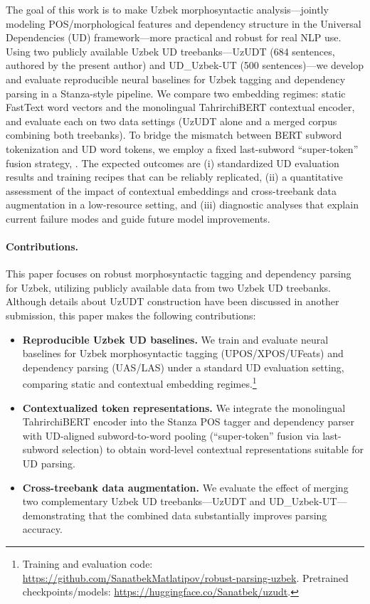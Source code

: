 \documentclass[runningheads]{llncs}
\begin{document}
The goal of this work is to make Uzbek morphosyntactic analysis---jointly modeling POS/morphological features and dependency structure in the Universal Dependencies (UD) framework---more practical and robust for real NLP use. Using two publicly available Uzbek UD treebanks---UzUDT (684 sentences, authored by the present author) and UD\_Uzbek-UT (500 sentences)---we develop and evaluate reproducible neural baselines for Uzbek tagging and dependency parsing in a Stanza-style pipeline\cite{Qi2020-zr}. We compare two embedding regimes: static FastText word vectors and the monolingual TahrirchiBERT contextual encoder, and evaluate each on two data settings (UzUDT alone and a merged corpus combining both treebanks). To bridge the mismatch between BERT subword tokenization and UD word tokens, we employ a fixed last-subword ``super-token'' fusion strategy\cite{Ho2021-cc}, \cite{hopton-etal-2025-functional}. The expected outcomes are (i) standardized UD evaluation results and training recipes that can be reliably replicated, (ii) a quantitative assessment of the impact of contextual embeddings and cross-treebank data augmentation in a low-resource setting, and (iii) diagnostic analyses that explain current failure modes and guide future model improvements.

\paragraph{Contributions.}
This paper focuses on robust morphosyntactic tagging and dependency parsing for Uzbek, utilizing publicly available data from two Uzbek UD treebanks. Although details about UzUDT construction have been discussed in another submission, this paper makes the following contributions:
\begin{itemize}
    \item \textbf{Reproducible Uzbek UD baselines.} We train and evaluate neural baselines for Uzbek morphosyntactic tagging (UPOS/XPOS/UFeats) and dependency parsing (UAS/LAS) under a standard UD evaluation setting, comparing static and contextual embedding regimes.\footnote{Training and evaluation code: \url{https://github.com/SanatbekMatlatipov/robust-parsing-uzbek}. Pretrained checkpoints/models: \url{https://huggingface.co/Sanatbek/uzudt}.}
    \item \textbf{Contextualized token representations.} We integrate the monolingual TahrirchiBERT encoder into the Stanza POS tagger and dependency parser with UD-aligned subword-to-word pooling (``super-token'' fusion via last-subword selection) to obtain word-level contextual representations suitable for UD parsing.
    \item \textbf{Cross-treebank data augmentation.} We evaluate the effect of merging two complementary Uzbek UD treebanks---UzUDT and UD\_Uzbek-UT---demonstrating that the combined data substantially improves parsing accuracy.
\end{itemize}
\end{document}
